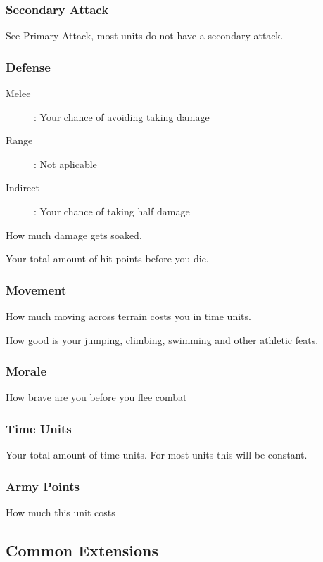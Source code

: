 \documentclass[a4paper]{article}
\begin{document}
\subsubsection{Secondary Attack}

See Primary Attack, most units do not have a secondary attack.

\subsubsection{Defense}

\begin{description}
\item[Melee]: Your chance of avoiding taking damage
\item[Range]: Not aplicable
\item[Indirect]: Your chance of taking half damage
\end{description}

How much damage gets soaked.

Your total amount of hit points before you die.

\subsubsection{Movement}

How much moving across terrain costs you in time units.

How good is your jumping, climbing, swimming and other athletic feats.

\subsubsection{Morale}
How brave are you before you flee combat

\subsubsection{Time Units}
Your total amount of time units. For most units this will be constant.

\subsubsection{Army Points}
How much this unit costs

\subsection{Common Extensions}
\end{document}
